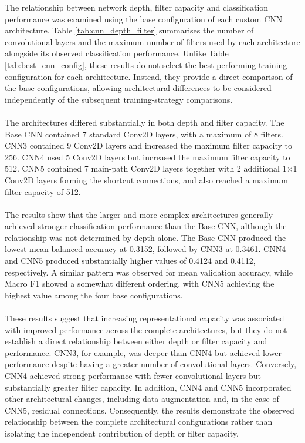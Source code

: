 \documentclass[12pt, a4paper]{report}
\begin{document}
				The relationship between network depth, filter capacity and classification performance was examined using the base configuration of each custom CNN architecture. Table \ref{tab:cnn_depth_filter} summarises the number of convolutional layers and the maximum number of filters used by each architecture alongside its observed classification performance. Unlike Table \ref{tab:best_cnn_config}, these results do not select the best-performing training configuration for each architecture. Instead, they provide a direct comparison of the base configurations, allowing architectural differences to be considered independently of the subsequent training-strategy comparisons.\\\\
				The architectures differed substantially in both depth and filter capacity. The Base CNN contained 7 standard Conv2D layers, with a maximum of 8 filters. CNN3 contained 9 Conv2D layers and increased the maximum filter capacity to 256. CNN4 used 5 Conv2D layers but increased the maximum filter capacity to 512. CNN5 contained 7 main-path Conv2D layers together with 2 additional 1$\times$1 Conv2D layers forming the shortcut connections, and also reached a maximum filter capacity of 512.\\\\
				The results show that the larger and more complex architectures generally achieved stronger classification performance than the Base CNN, although the relationship was not determined by depth alone. The Base CNN produced the lowest mean balanced accuracy at 0.3152, followed by CNN3 at 0.3461. CNN4 and CNN5 produced substantially higher values of 0.4124 and 0.4112, respectively. A similar pattern was observed for mean validation accuracy, while Macro F1 showed a somewhat different ordering, with CNN5 achieving the highest value among the four base configurations.\\\\
				These results suggest that increasing representational capacity was associated with improved performance across the complete architectures, but they do not establish a direct relationship between either depth or filter capacity and performance. CNN3, for example, was deeper than CNN4 but achieved lower performance despite having a greater number of convolutional layers. Conversely, CNN4 achieved strong performance with fewer convolutional layers but substantially greater filter capacity. In addition, CNN4 and CNN5 incorporated other architectural changes, including data augmentation and, in the case of CNN5, residual connections. Consequently, the results demonstrate the observed relationship between the complete architectural configurations rather than isolating the independent contribution of depth or filter capacity.\\
\end{document}
